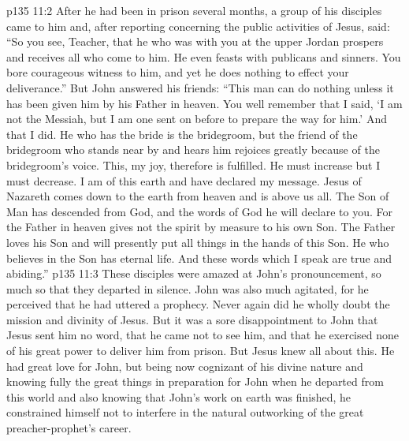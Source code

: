 \vs p135 11:2 \pc After he had been in prison several months, a group of his disciples came to him and, after reporting concerning the public activities of Jesus, said: “So you see, Teacher, that he who was with you at the upper Jordan prospers and receives all who come to him. He even feasts with publicans and sinners. You bore courageous witness to him, and yet he does nothing to effect your deliverance.” But John answered his friends: “This man can do nothing unless it has been given him by his Father in heaven. You well remember that I said, ‘I am not the Messiah, but I am one sent on before to prepare the way for him.’ And that I did. He who has the bride is the bridegroom, but the friend of the bridegroom who stands near by and hears him rejoices greatly because of the bridegroom’s voice. This, my joy, therefore is fulfilled. He must increase but I must decrease. I am of this earth and have declared my message. Jesus of Nazareth comes down to the earth from heaven and is above us all. The Son of Man has descended from God, and the words of God he will declare to you. For the Father in heaven gives not the spirit by measure to his own Son. The Father loves his Son and will presently put all things in the hands of this Son. He who believes in the Son has eternal life. And these words which I speak are true and abiding.”
\vs p135 11:3 \pc These disciples were amazed at John’s pronouncement, so much so that they departed in silence. John was also much agitated, for he perceived that he had uttered a prophecy. Never again did he wholly doubt the mission and divinity of Jesus. But it was a sore disappointment to John that Jesus sent him no word, that he came not to see him, and that he exercised none of his great power to deliver him from prison. But Jesus knew all about this. He had great love for John, but being now cognizant of his divine nature and knowing fully the great things in preparation for John when he departed from this world and also knowing that John’s work on earth was finished, he constrained himself not to interfere in the natural outworking of the great preacher\hyp{}prophet’s career.
